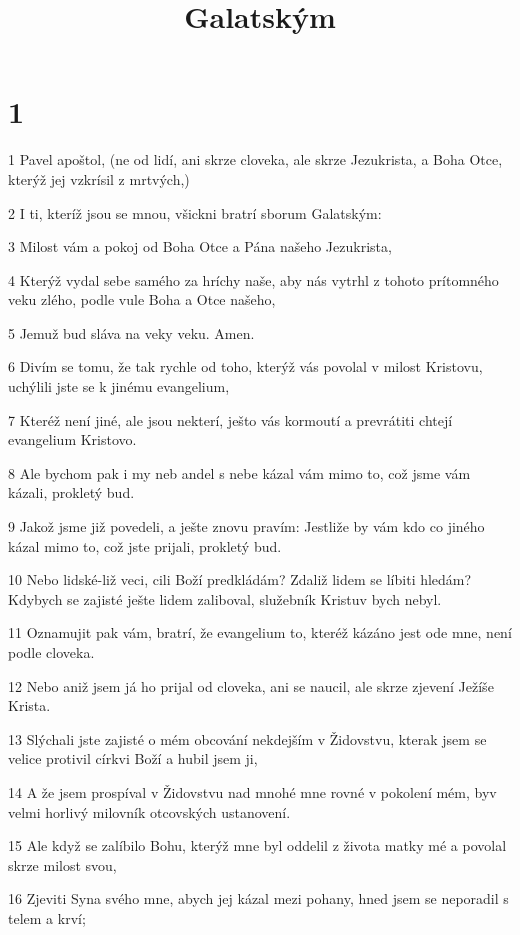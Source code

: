 

\title{Galatským}

\chapter{1}

\par 1 Pavel apoštol, (ne od lidí, ani skrze cloveka, ale skrze Jezukrista, a Boha Otce, kterýž jej vzkrísil z mrtvých,)
\par 2 I ti, kteríž jsou se mnou, všickni bratrí sborum Galatským:
\par 3 Milost vám a pokoj od Boha Otce a Pána našeho Jezukrista,
\par 4 Kterýž vydal sebe samého za hríchy naše, aby nás vytrhl z tohoto prítomného veku zlého, podle vule Boha a Otce našeho,
\par 5 Jemuž bud sláva na veky veku. Amen.
\par 6 Divím se tomu, že tak rychle od toho, kterýž vás povolal v milost Kristovu, uchýlili jste se k jinému evangelium,
\par 7 Kteréž není jiné, ale jsou nekterí, ješto vás kormoutí a prevrátiti chtejí evangelium Kristovo.
\par 8 Ale bychom pak i my neb andel s nebe kázal vám mimo to, což jsme vám kázali, prokletý bud.
\par 9 Jakož jsme již povedeli, a ješte znovu pravím: Jestliže by vám kdo co jiného kázal mimo to, což jste prijali, prokletý bud.
\par 10 Nebo lidské-liž veci, cili Boží predkládám? Zdaliž lidem se líbiti hledám? Kdybych se zajisté ješte lidem zaliboval, služebník Kristuv bych nebyl.
\par 11 Oznamujit pak vám, bratrí, že evangelium to, kteréž kázáno jest ode mne, není podle cloveka.
\par 12 Nebo aniž jsem já ho prijal od cloveka, ani se naucil, ale skrze zjevení Ježíše Krista.
\par 13 Slýchali jste zajisté o mém obcování nekdejším v Židovstvu, kterak jsem se velice protivil církvi Boží a hubil jsem ji,
\par 14 A že jsem prospíval v Židovstvu nad mnohé mne rovné v pokolení mém, byv velmi horlivý milovník otcovských ustanovení.
\par 15 Ale když se zalíbilo Bohu, kterýž mne byl oddelil z života matky mé a povolal skrze milost svou,
\par 16 Zjeviti Syna svého mne, abych jej kázal mezi pohany, hned jsem se neporadil s telem a krví;
